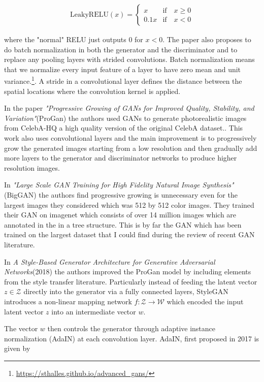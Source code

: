 \begin{align}
  \text{LeakyRELU}(x) =
  \begin{cases}
    x & \text{if}\quad x\geq0\\
    0.1x & \text{if}\quad x<0
  \end{cases}
\end{align}

where the "normal" RELU just outputs $0$ for $x<0$. The paper also proposes to do batch normalization in both the generator and the discriminator and to replace any pooling layers with strided convolutions. Batch normalization means that we normalize every input feature of a layer to have zero mean and unit variance.\footnote{\url{https://sthalles.github.io/advanced_gans/}}. A stride in a convolutional layer defines the distance between the spatial locations where the convolution kernel is applied.

In the paper \textit{"Progressive Growing of GANs for Improved Quality, Stability, and Variation"}(ProGan)\cite{progan} the authors used GANs to generate photorealistic images from CelebA-HQ a high quality version of the original CelebA dataset.\cite{celebA}. This work also uses convolutional layers and the main improvement is to progressively grow the generated images starting from a low resolution and then gradually add more layers to the generator and discriminator networks to produce higher resolution images.

In \textit{"Large Scale GAN Training for High Fidelity Natural Image Synthesis"}(BigGAN) \cite{biggan} the authors find progressive growing is unnecessary even for the largest images they considered which was 512 by 512 color images. They trained their GAN on imagenet which consists of over 14 million images which are annotated in the in a tree structure.\cite{imagenet} This is by far the GAN which has been trained on the largest dataset that I could find during the review of recent GAN literature.

In \textit{A Style-Based Generator Architecture for Generative Adversarial Networks}(2018)\cite{stylegan} the authors improved the ProGan model by including elements from the style transfer literature. Particularly instead of feeding the latent vector $z\in\mathcal{Z}$ directly into the generator via a fully connected layers, StyleGAN introduces a non-linear mapping network $f:\mathcal{Z}\to\mathcal{W}$ which encoded the input latent vector $z$ into an intermediate vector $w$.

The vector $w$ then controls the generator through adaptive instance normalization (AdaIN) at each convolution layer.
AdaIN, first proposed in 2017 \cite{adain} is given by

